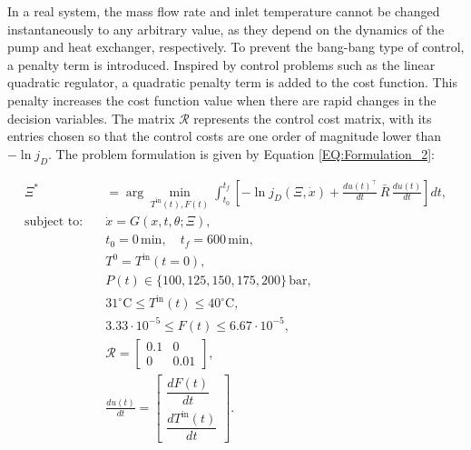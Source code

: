 \documentclass[a4paper,fleqn]{cas-dc}
\begin{document}
		In a real system, the mass flow rate and inlet temperature cannot be changed instantaneously to any arbitrary value, as they depend on the dynamics of the pump and heat exchanger, respectively. To prevent the bang-bang type of control, a penalty term is introduced. Inspired by control problems such as the linear quadratic regulator, a quadratic penalty term is added to the cost function. This penalty increases the cost function value when there are rapid changes in the decision variables. The matrix $\mathcal{R}$ represents the control cost matrix, with its entries chosen so that the control costs are one order of magnitude lower than $-\ln j_D$. The problem formulation is given by Equation \ref{EQ:Formulation_2}:
		
		{\footnotesize 
			\begin{equation}
				\begin{aligned}
					\Xi^* &= \arg \min_{T^{\text{in}}(t), F(t)} 
					\int_{t_0}^{t_f} \left[ - \ln j_D(\Xi, \dot{x}) + 
					\frac{du(t)^\top}{dt} \, \bar{R} \, \frac{du(t)}{dt} \right] dt, \\
					\text{subject to:} \quad 
					& \dot{x} = G(x, t, \theta; \Xi), \\
					& t_0 = 0 \, \text{min}, \quad t_f = 600 \, \text{min}, \\
					& T^0 = T^{\text{in}}(t=0), \\
					& P(t) \in \{100, 125, 150, 175, 200\} \, \text{bar}, \\
					& 31^\circ\text{C} \leq T^{\text{in}}(t) \leq 40^\circ\text{C}, \\
					& 3.33 \cdot 10^{-5} \leq F(t) \leq 6.67 \cdot 10^{-5}, \\
					& \mathcal{R} = 
					\begin{bmatrix} 
						0.1 & 0 \\ 
						0 & 0.01 
					\end{bmatrix}, \\
					& \frac{du(t)}{dt} = 
					\begin{bmatrix} 
						\dfrac{dF(t)}{dt} \\ 
						\dfrac{dT^{\text{in}}(t)}{dt} 
					\end{bmatrix}.
				\end{aligned}
				\label{EQ:Formulation_2}
		\end{equation} }
		
		
\end{document}
